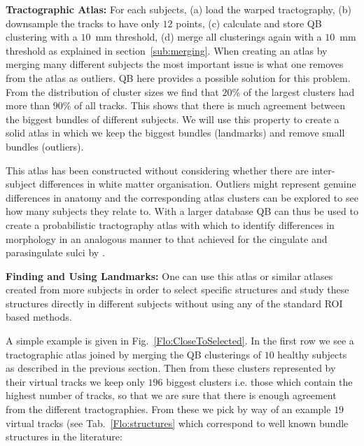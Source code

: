 \documentclass[journal]{IEEEtran}
\begin{document}
\textbf{Tractographic Atlas:} For each subjects, (a) load the warped
tractography, (b) downsample the tracks to have only $12$ points, (c) calculate
and store QB clustering with a $10$~mm threshold, (d) merge all
clusterings again with a $10$~mm threshold as explained in
section~\ref{sub:merging}. When creating an atlas by merging
many different subjects the most important issue is what one removes
from the atlas as outliers.  QB here provides a possible solution for
this problem. From the distribution of cluster sizes we find that $20\%$
of the largest clusters had more than $90\%$ of all tracks. This shows
that there is much agreement between the biggest bundles of different
subjects.  We will use this property to create a solid atlas in which we
keep the biggest bundles (landmarks) and remove small bundles
(outliers).

This atlas has been constructed without considering whether there are
inter-subject differences in white matter organisation. Outliers might
represent genuine differences in anatomy and the corresponding atlas
clusters can be explored to see how many subjects they relate to. With a
larger database QB can thus be used to create a probabilistic
tractography atlas with which to identify differences in morphology in
an analogous manner to that achieved for the cingulate and parasingulate
sulci by \cite{paus1996human}.

\textbf{Finding and Using Landmarks:} One can use this atlas or similar
atlases created from more subjects in order to select specific
structures and study these structures directly in different subjects
without using any of the standard ROI based methods.

A simple example is given in Fig.~\ref{Flo:CloseToSelected}. In the
first row we see a tractographic atlas joined by merging the QB
clusterings of $10$ healthy subjects as described in the previous
section. Then from these clusters represented by their virtual tracks we
keep only $196$ biggest clusters i.e. those which contain the highest
number of tracks, so that we are sure that there is enough agreement
from the different tractographies. From these we pick by way of an
example $19$ virtual tracks (see Tab.~\ref{Flo:structures} which
correspond to well known bundle structures in the literature:
\end{document}
